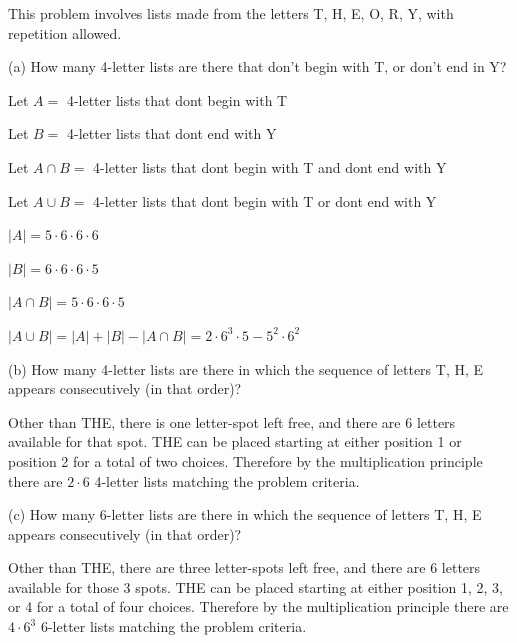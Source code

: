 \documentclass[openany, 11pt]{book}
\begin{document}
\begin{exercise}{}{}
	This problem involves lists made from the letters T, H, E, O, R, Y, with repetition allowed.
	\begin{alist}
		\item (a) How many 4-letter lists are there that don't begin with T, or don't
		end in Y?
		\item Let $A=$ 4-letter lists that dont begin with T
		\item Let $B=$ 4-letter lists that dont end with Y
		\item Let $A\cap B=$ 4-letter lists that dont begin with T and dont end with Y
		\item Let $A\cup B=$ 4-letter lists that dont begin with T or dont end with Y
		\item $|A|= 5\cdot6\cdot6\cdot6$
		\item $|B|= 6\cdot6\cdot6\cdot5$
		\item $|A\cap B|= 5\cdot6\cdot6\cdot5$
		\item $|A\cup B|= |A| + |B| - |A\cap B| = 2\cdot 6^3\cdot5 - 5^2\cdot6^2$
		\item (b) How many 4-letter lists are there in which the sequence of letters T,
		H, E appears consecutively (in that order)?
		\item Other than THE, there is one letter-spot left free, and there are 6 letters
		available for that spot. THE can be placed starting at either position 1 or
		position 2 for a total of two choices. Therefore by the multiplication
		principle there are $2\cdot6$ 4-letter lists matching the problem criteria.
		\item (c) How many 6-letter lists are there in which the sequence of letters T,
		H, E appears consecutively (in that order)?
		\item Other than THE, there are three letter-spots left free, and there are 6 letters
		available for those 3 spots. THE can be placed starting at either position
		1, 2, 3, or 4 for a total of four choices. Therefore by the multiplication
		principle there are $4\cdot6^3$ 6-letter lists matching the problem criteria.
	\end{alist}
\end{exercise}
\end{document}
